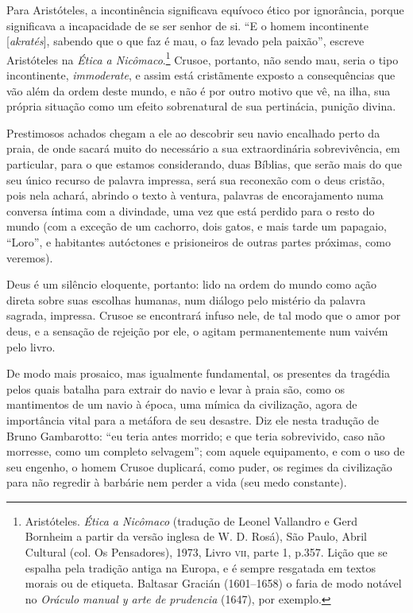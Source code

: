 Para Aristóteles, a incontinência significava equívoco ético por
ignorância, porque significava a incapacidade de se ser senhor de si.
``E o homem incontinente {[}\textit{akratés}{]}, sabendo que o que faz é mau, o
faz levado pela paixão'', escreve Aristóteles na \emph{Ética a
Nicômaco}.\footnote{Aristóteles. \emph{Ética a Nicômaco} (tradução de
  Leonel Vallandro e Gerd Bornheim a partir da versão inglesa de W. D.
  Rosá), São Paulo, Abril Cultural (col. Os Pensadores), 1973, Livro
  \textsc{vii}, parte 1, p.357. Lição que se espalha pela tradição antiga na
  Europa, e é sempre resgatada em textos morais ou de etiqueta. Baltasar
  Gracián (1601--1658) o faria de modo notável no \emph{Oráculo manual y
  arte de prudencia} (1647), por exemplo.} Crusoe, portanto, não sendo
mau, seria o tipo incontinente, \emph{immoderate}, e assim está
cristãmente exposto a consequências que vão além da ordem deste mundo, e
não é por outro motivo que vê, na ilha, sua própria situação como um
efeito sobrenatural de sua pertinácia, punição divina.

Prestimosos achados chegam a ele ao descobrir seu navio encalhado perto
da praia, de onde sacará muito do necessário a sua extraordinária
sobrevivência, em particular, para o que estamos considerando, duas
Bíblias, que serão mais do que seu único recurso de palavra impressa,
será sua reconexão com o deus cristão, pois nela achará, abrindo o texto
à ventura, palavras de encorajamento numa conversa íntima com a
divindade, uma vez que está perdido para o resto do mundo (com a exceção
de um cachorro, dois gatos, e mais tarde um papagaio, ``Loro'', e
habitantes autóctones e prisioneiros de outras partes próximas, como
veremos).

Deus é um silêncio eloquente, portanto: lido na ordem do mundo como ação
direta sobre suas escolhas humanas, num diálogo pelo mistério da palavra
sagrada, impressa. Crusoe se encontrará infuso nele, de tal modo que o
amor por deus, e a sensação de rejeição por ele, o agitam
permanentemente num vaivém pelo livro.

De modo mais prosaico, mas igualmente fundamental, os presentes da
tragédia pelos quais batalha para extrair do navio e levar à praia são,
como os mantimentos de um navio à época, uma mímica da civilização,
agora de importância vital para a metáfora de seu desastre. Diz ele
nesta tradução de Bruno Gambarotto: ``eu teria antes morrido; e que
teria sobrevivido, caso não morresse, como um completo selvagem''; com
aquele equipamento, e com o uso de seu engenho, o homem Crusoe
duplicará, como puder, os regimes da civilização para não regredir à
barbárie nem perder a vida (seu medo constante).


